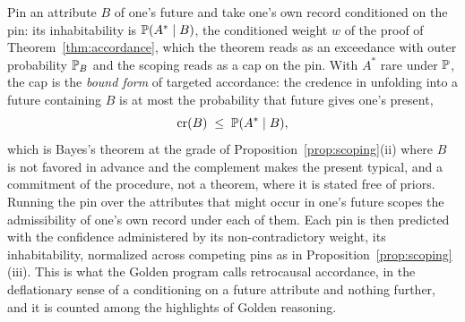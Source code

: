 \begin{remark}
\label{rem:pins}
Pin an attribute $B$ of one's future and take one's own record
conditioned on the pin: its inhabitability is $\mathbb{P}(A^\ast\mid B)$, the
conditioned weight $w$ of the proof of Theorem~\ref{thm:accordance},
which the theorem reads as an exceedance with outer probability $\mathbb{P}_B$
and the scoping reads as a cap on the pin. With $A^\ast$ rare under
$\mathbb{P}$, the cap is the \emph{bound form} of targeted accordance: the
credence in unfolding into a future containing $B$ is at most the
probability that future gives one's present,
\begin{equation}\label{eq:boundform}
\mathrm{cr}(B)\;\le\;\mathbb{P}(A^\ast\mid B),
\end{equation}
which is Bayes's theorem at the grade of
Proposition~\ref{prop:scoping}(ii) where $B$ is not favored in advance
and the complement makes the present typical, and a commitment of the
procedure, not a theorem, where it is stated free of priors. Running
the pin over the attributes that might occur in one's future scopes the
admissibility of one's own record under each of them. Each pin is then
predicted with the confidence administered by
its non-contradictory weight, its inhabitability, normalized across
competing pins as in Proposition~\ref{prop:scoping}(iii). This is what
the Golden program calls retrocausal accordance, in the deflationary
sense of a conditioning on a future attribute and nothing further, and
it is counted among the highlights of Golden reasoning.
\end{remark}

